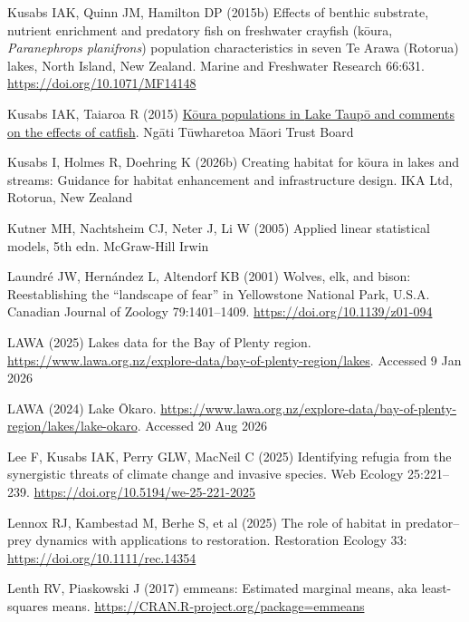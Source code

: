 \documentclass[
  12pt,
  a4paper,
  oneside]{scrbook}
\newlength{\cslhangindent}
\newenvironment{CSLReferences}[2] %
 {\begin{list}{}{%
  \setlength{\itemindent}{0pt}
  \setlength{\leftmargin}{0pt}
  \setlength{\parsep}{0pt}
  \ifodd #1
   \setlength{\leftmargin}{\cslhangindent}
   \setlength{\itemindent}{-1\cslhangindent}
  \fi
  \setlength{\itemsep}{#2\baselineskip}}}
 {\end{list}}
\renewenvironment{CSLReferences}[2]
   {\begin{list}{}{%
    \setlength{\itemindent}{0pt}
    \setlength{\leftmargin}{0pt}
    \setlength{\parsep}{0pt}
    \ifodd #1
     \setlength{\leftmargin}{\cslhangindent}
     \setlength{\itemindent}{-1\cslhangindent}
    \fi
    \setlength{\itemsep}{0.3\baselineskip}}}
   {\end{list}}%
\begin{document}
\begin{CSLReferences}{1}{1}
Kusabs IAK, Quinn JM, Hamilton DP (2015b) Effects of benthic substrate,
nutrient enrichment and predatory fish on freshwater crayfish (kōura,
{\emph{Paranephrops planifrons}}) population characteristics in seven
{Te Arawa (Rotorua)} lakes, {North Island, New Zealand}. Marine and
Freshwater Research 66:631. \url{https://doi.org/10.1071/MF14148}

Kusabs IAK, Taiaroa R (2015)
\href{https://doi.org/10.13140/RG.2.2.12471.89761}{K{ō}ura populations
in {Lake Taup{ō}} and comments on the effects of catfish}. Ngāti
Tūwharetoa Māori Trust Board

Kusabs I, Holmes R, Doehring K (2026b) Creating habitat for kōura in
lakes and streams: {Guidance} for habitat enhancement and infrastructure
design. IKA Ltd, Rotorua, New Zealand

Kutner MH, Nachtsheim CJ, Neter J, Li W (2005) Applied linear
statistical models, 5th edn. McGraw-Hill Irwin

Laundré JW, Hernández L, Altendorf KB (2001) Wolves, elk, and bison:
Reestablishing the {``landscape of fear''} in {Yellowstone National
Park}, {U.S.A.} Canadian Journal of Zoology 79:1401--1409.
\url{https://doi.org/10.1139/z01-094}

LAWA (2025) Lakes data for the {Bay of Plenty} region.
\url{https://www.lawa.org.nz/explore-data/bay-of-plenty-region/lakes}.
Accessed 9 Jan 2026

LAWA (2024) Lake {Ōkaro}.
\url{https://www.lawa.org.nz/explore-data/bay-of-plenty-region/lakes/lake-okaro}.
Accessed 20 Aug 2026

Lee F, Kusabs IAK, Perry GLW, MacNeil C (2025) Identifying refugia from
the synergistic threats of climate change and invasive species. Web
Ecology 25:221--239. \url{https://doi.org/10.5194/we-25-221-2025}

Lennox RJ, Kambestad M, Berhe S, et al (2025) The role of habitat in
predator--prey dynamics with applications to restoration. Restoration
Ecology 33: \url{https://doi.org/10.1111/rec.14354}

Lenth RV, Piaskowski J (2017) {emmeans}: Estimated marginal means, aka
least-squares means. \url{https://CRAN.R-project.org/package=emmeans}


\end{CSLReferences}
\end{document}
